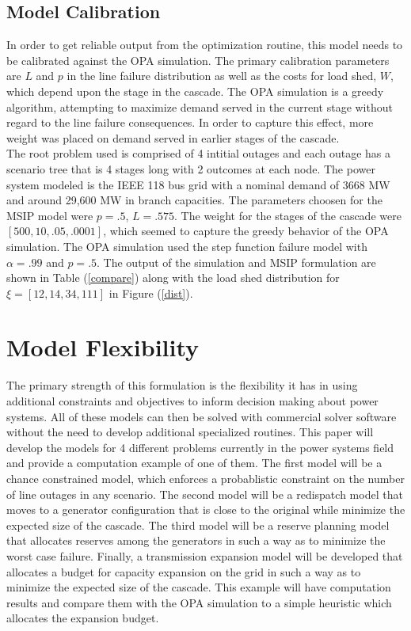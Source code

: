 \subsection{Model Calibration}
In order to get reliable output from the optimization routine, this model needs to be calibrated against the OPA simulation.  The primary calibration parameters are $L$ and $p$ in the line failure distribution as well as the costs for load shed, $W$, which depend upon the stage in the cascade.  The OPA simulation is a greedy algorithm, attempting to maximize demand served in the current stage without regard to the line failure consequences.  In order to capture this effect, more weight was placed on demand served in earlier stages of the cascade. \\

 The root problem used is comprised of 4 intitial outages and each outage has a scenario tree that is 4 stages long with 2 outcomes at each node.  The power system modeled is the IEEE 118 bus grid with a nominal demand of 3668 MW and around 29,600 MW in branch capacities.  The parameters choosen for the MSIP model were $p=.5$, $L =.575$.  The weight for the stages of the cascade were $[500, 10, .05, .0001]$, which seemed to capture the greedy behavior of the OPA simulation.  The OPA simulation used the step function failure model with $\alpha=.99$ and $p=.5$.  The output of the simulation and MSIP formulation are shown in Table (\ref{compare}) along with the load shed distribution for $\xi = [12,14,34,111]$ in Figure (\ref{dist}). 








%



\section{Model Flexibility}
The primary strength of this formulation is the flexibility it has in using additional constraints and objectives to inform decision making about power systems.  All of these models can then be solved with commercial solver software without the need to develop additional specialized routines.  This paper will develop the models for 4 different problems currently in the power systems field and provide a computation example of one of them.  The first model will be a chance constrained model, which enforces a probablistic constraint on the number of line outages in any scenario.  The second model will be a redispatch model that moves to a generator configuration that is close to the original while minimize the expected size of the cascade.  The third model will be a reserve planning model that allocates reserves among the generators in such a way as to minimize the worst case failure.  Finally, a transmission expansion model will be developed that allocates a budget for capacity expansion on the grid in such a way as to minimize the expected size of the cascade.  This example will have computation results and compare them with the OPA simulation to a simple heuristic which allocates the expansion budget.
